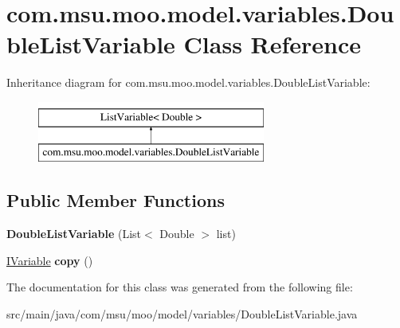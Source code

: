 \hypertarget{classcom_1_1msu_1_1moo_1_1model_1_1variables_1_1DoubleListVariable}{\section{com.\-msu.\-moo.\-model.\-variables.\-Double\-List\-Variable Class Reference}
\label{classcom_1_1msu_1_1moo_1_1model_1_1variables_1_1DoubleListVariable}
}
Inheritance diagram for com.\-msu.\-moo.\-model.\-variables.\-Double\-List\-Variable\-:\begin{figure}[H]
\begin{center}
\leavevmode
\includegraphics[height=2.000000cm]{classcom_1_1msu_1_1moo_1_1model_1_1variables_1_1DoubleListVariable}
\end{center}
\end{figure}
\subsection*{Public Member Functions}
\begin{DoxyCompactItemize}
\item 
\hypertarget{classcom_1_1msu_1_1moo_1_1model_1_1variables_1_1DoubleListVariable_a89e8cdbe9a215ffa3946a2ededbf01ab}{{\bfseries Double\-List\-Variable} (List$<$ Double $>$ list)}\label{classcom_1_1msu_1_1moo_1_1model_1_1variables_1_1DoubleListVariable_a89e8cdbe9a215ffa3946a2ededbf01ab}

\item 
\hypertarget{classcom_1_1msu_1_1moo_1_1model_1_1variables_1_1DoubleListVariable_adee645c8b18616dffccbb9ce0f34ce84}{\hyperlink{interfacecom_1_1msu_1_1moo_1_1model_1_1interfaces_1_1IVariable}{I\-Variable} {\bfseries copy} ()}\label{classcom_1_1msu_1_1moo_1_1model_1_1variables_1_1DoubleListVariable_adee645c8b18616dffccbb9ce0f34ce84}

\end{DoxyCompactItemize}


The documentation for this class was generated from the following file\-:\begin{DoxyCompactItemize}
\item 
src/main/java/com/msu/moo/model/variables/Double\-List\-Variable.\-java\end{DoxyCompactItemize}
